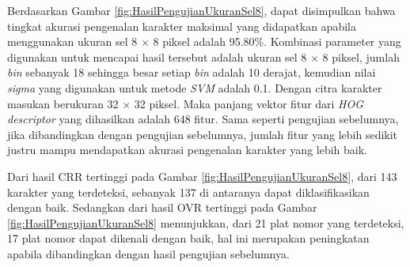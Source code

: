 \begin{adjustbox}{width=1\textwidth}
	\noindent\begin{minipage}{\linewidth}
		\centering{}
		\label{fig:HasilPengujianUkuranSel8}
	\end{minipage}
\end{adjustbox}

\noindent Berdasarkan Gambar \ref{fig:HasilPengujianUkuranSel8}, dapat disimpulkan bahwa tingkat akurasi pengenalan karakter maksimal yang didapatkan apabila menggunakan ukuran sel 8 $\times$ 8 piksel adalah 95.80\%. Kombinasi parameter yang digunakan untuk mencapai hasil tersebut adalah ukuran sel 8 $\times$ 8 piksel, jumlah \textit{bin} sebanyak 18 sehingga besar setiap \textit{bin} adalah 10 derajat, kemudian nilai \textit{sigma} yang digunakan untuk metode \textit{SVM} adalah 0.1. Dengan citra karakter masukan berukuran 32 $\times$ 32 piksel. Maka panjang vektor fitur dari \textit{HOG descriptor} yang dihasilkan adalah 648 fitur. Sama seperti pengujian sebelumnya, jika dibandingkan dengan pengujian sebelumnya, jumlah fitur yang lebih sedikit justru mampu mendapatkan akurasi pengenalan karakter yang lebih baik.

\noindent Dari hasil CRR tertinggi pada Gambar \ref{fig:HasilPengujianUkuranSel8}, dari 143 karakter yang terdeteksi, sebanyak 137 di antaranya dapat diklasifikasikan dengan baik. Sedangkan dari hasil OVR tertinggi pada Gambar \ref{fig:HasilPengujianUkuranSel8} menunjukkan, dari 21 plat nomor yang terdeteksi, 17 plat nomor dapat dikenali dengan baik, hal ini merupakan peningkatan apabila dibandingkan dengan hasil pengujian sebelumnya.

